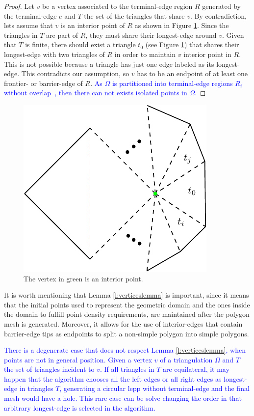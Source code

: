 \documentclass[pdflatex,sn-mathphys]{sn-jnl}%
\theoremstyle{thmstyleone}%
\theoremstyle{thmstyletwo}%
\theoremstyle{thmstylethree}%
\begin{document}
\begin{proof} Let $v$ be  a vertex  associated to the terminal-edge region $R$ generated by the terminal-edge $e$ and  $T$ the set of the triangles that share $v$. By contradiction, lets assume that $v$ is an interior point of $R$ as shown  in Figure \ref{fig:lemmaquitadomingos}. Since the triangles in $T$ are part of $R$, they must share their longest-edge around $v$. 
Given that $T$ is finite, there should exist a triangle $t_0$ (see Figure \ref{fig:lemmaquitadomingos}) that shares their longest-edge with two triangles of $R$ in order to maintain $v$ interior point in $R$. This is not possible because a triangle has just one edge labeled as its  longest-edge. This contradicts our assumption, so $v$ has to be an endpoint of  at least one frontier- or barrier-edge of $R$. \textcolor{blue}{ As $\Omega$ is partitioned into terminal-edge regions $R_i$ without overlap~\cite{Ojeda2018ANA}, then there can not exists isolated points in $\Omega$.}
\end{proof}

\begin{figure}[h]
\centering
\includegraphics[width=0.25\linewidth]{demostracionlemma2.1} 
\caption{The  vertex in green is an interior point.}
\label{fig:lemmaquitadomingos}    
\end{figure}


It is worth mentioning that Lemma \ref{l:verticeslemma} is important, since it means that the initial points used to represent the geometric domain and the ones inside the domain to fulfill point density requirements, are maintained after the polygon mesh is generated. Moreover, it allows for the use of interior-edges that contain barrier-edge tips as endpoints to split a non-simple polygon into simple polygons.

\textcolor{blue}{There is a degenerate case that does not respect Lemma \ref{l:verticeslemma}, when points are not in general position. Given a vertex $v$ of a triangulation $\Omega$ and $T$ the set of triangles incident to $v$. If all triangles in $T$ are equilateral, it may happen that the algorithm chooses all the left edges or all right edges as longest-edge in triangles $T$, generating a circular lepp without terminal-edge and the final mesh would have a hole. This rare case can be solve changing the order in that arbitrary longest-edge is selected in the algorithm.}
\end{document}
